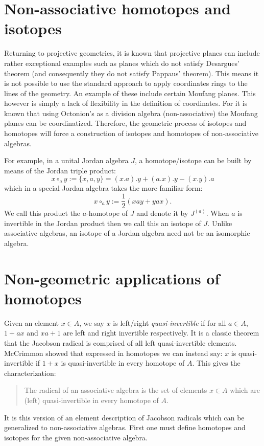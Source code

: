 \documentclass[12pt]{article}
\begin{document}
\section{Non-associative homotopes and isotopes}

Returning to projective geometries, it is known that projective planes can
include rather exceptional examples such as planes which do not satisfy 
Desargues' theorem (and consequently they do not satisfy Pappaus' theorem).
This means it is not possible to use the standard approach to apply coordinates rings to the lines of the geometry.  An example of these include certain
Moufang planes.  This however is simply a lack of flexibility in the
definition of coordinates.  For it is known that using Octonion's as a division
algebra (non-associative) the Moufang planes can be coordinatized.  Therefore,
the geometric process of isotopes and homotopes will force a construction
of isotopes and homotopes of non-associative algebras.  

For example, in a unital Jordan algebra $J$, a homotope/isotope can be built 
by means of the Jordan triple product:
\[x\circ_a y := \{x,a,y\}= (x.a).y+(a.x).y-(x.y).a\]
which in a special Jordan algebra takes the more familiar form:
\[x\circ_a y := \frac{1}{2}(xay+yax).\]
We call this product the $a$-homotope of $J$ and denote it by $J^{(a)}$.
When $a$ is invertible in the Jordan product then we call this an isotope of $J$.  Unlike associative algebras, an isotope of a Jordan algebra need not
be an isomorphic algebra.

\section{Non-geometric applications of homotopes}

Given an element $x\in A$, we say $x$ is left/right \emph{quasi-invertible} 
if for all $a\in A$, $1+ax$ and $xa+1$ are left and right invertible respectively.  It is a classic theorem that the Jacobson radical is 
comprised of all left quasi-invertible elements.  McCrimmon showed 
that expressed in homotopes we can instead say: $x$ is quasi-invertible 
if $1+x$ is quasi-invertible in every homotope of $A$.   This gives the
characterization:
\begin{quote}
The radical of an associative algebra is the set of elements $x\in A$ which
are (left) quasi-invertible in every homotope of $A$.
\end{quote}

It is this version of an element description of Jacobson radicals which can be generalized to non-associative algebras.  First one must define homotopes and isotopes for the given non-associative algebra.  
\end{document}
